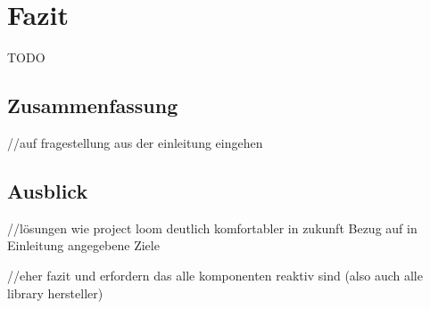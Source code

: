 \section{Fazit}
\label{sec:fazit}
TODO
\subsection{Zusammenfassung}
//auf fragestellung aus der einleitung eingehen
\subsection{Ausblick}
//lösungen wie project loom deutlich komfortabler in  zukunft
Bezug auf in Einleitung angegebene Ziele


//eher fazit
und erfordern das alle komponenten reaktiv sind (also auch alle library hersteller)
